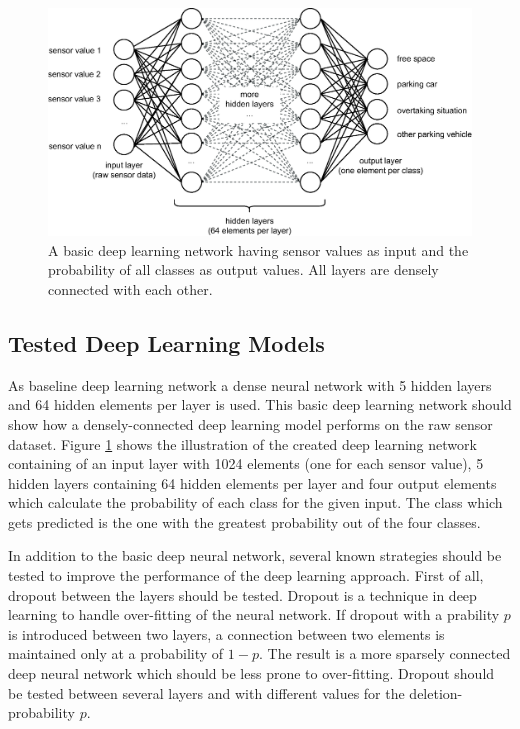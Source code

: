 \begin{figure}
	\centering
	\includegraphics[width=\textwidth]{img/deep_learning_basic_model_2.eps}
	\caption{A basic deep learning network having sensor values as input and the probability of all classes as output values. All layers are densely connected with each other.}
	\label{fig:densely_dl_network}
\end{figure}





\subsection{Tested Deep Learning Models}

As baseline deep learning network a dense neural network with 5 hidden layers and 64 hidden elements per layer is used. This basic deep learning network should show how a densely-connected deep learning model performs on the raw sensor dataset. Figure \ref{fig:densely_dl_network} shows the illustration of the created deep learning network containing of an input layer with 1024 elements (one for each sensor value), 5 hidden layers containing 64 hidden elements per layer and four output elements which calculate the probability of each class for the given input. The class which gets predicted is the one with the greatest probability out of the four classes. 

In addition to the basic deep neural network, several known strategies should be tested to improve the performance of the deep learning approach. First of all, dropout between the layers should be tested. Dropout is a technique in deep learning to handle over-fitting of the neural network. If dropout with a prability $p$ is introduced between two layers, a connection between two elements is maintained only at a probability of $1-p$. The result is a more sparsely connected deep neural network which should be less prone to over-fitting. Dropout should be tested between several layers and with different values for the deletion-probability $p$.

